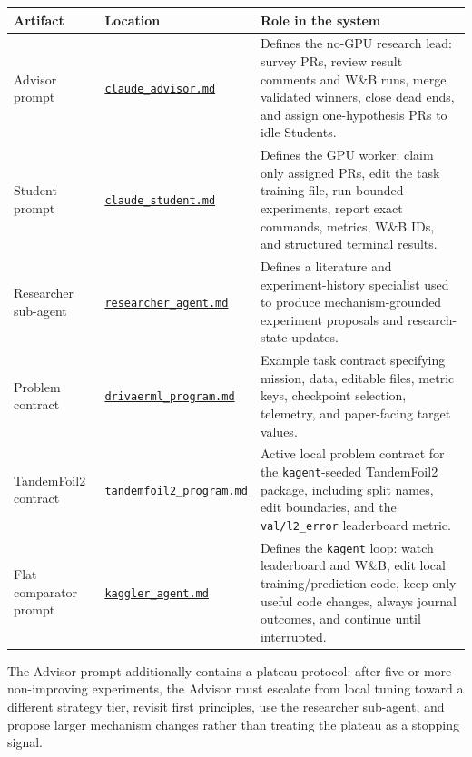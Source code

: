 \documentclass{article}
\newcommand{\appendixsourcelink}[1]{\href{https://github.com/wandb/senpai/blob/main/papers/appendix_sources/#1}{\nolinkurl{#1}}}
\begin{document}
\begin{center}
  \label{tab:instruction-source-map}
  \small
  \begin{tabular}{@{}p{}p{}p{}@{}}
    \toprule
    Artifact & Location & Role in the system \\
    \midrule
    Advisor prompt & \appendixsourcelink{claude_advisor.md} & Defines the no-GPU research lead: survey PRs, review result comments and W\&B runs, merge validated winners, close dead ends, and assign one-hypothesis PRs to idle Students. \\
    Student prompt & \appendixsourcelink{claude_student.md} & Defines the GPU worker: claim only assigned PRs, edit the task training file, run bounded experiments, report exact commands, metrics, W\&B IDs, and structured terminal results. \\
    Researcher sub-agent & \appendixsourcelink{researcher_agent.md} & Defines a literature and experiment-history specialist used to produce mechanism-grounded experiment proposals and research-state updates. \\
    Problem contract & \appendixsourcelink{drivaerml_program.md} & Example task contract specifying mission, data, editable files, metric keys, checkpoint selection, telemetry, and paper-facing target values. \\
    TandemFoil2 contract & \appendixsourcelink{tandemfoil2_program.md} & Active local problem contract for the \texttt{kagent}-seeded TandemFoil2 package, including split names, edit boundaries, and the \texttt{val/l2\_error} leaderboard metric. \\
    Flat comparator prompt & \appendixsourcelink{kaggler_agent.md} & Defines the \texttt{kagent} loop: watch leaderboard and W\&B, edit local training/prediction code, keep only useful code changes, always journal outcomes, and continue until interrupted. \\
    \bottomrule
  \end{tabular}
\end{center}

The Advisor prompt additionally contains a plateau protocol: after five or more non-improving experiments, the Advisor must escalate from local tuning toward a different strategy tier, revisit first principles, use the researcher sub-agent, and propose larger mechanism changes rather than treating the plateau as a stopping signal.
\end{document}
